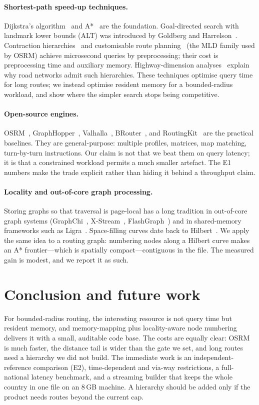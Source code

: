 \documentclass[sigconf,nonacm]{acmart}
\begin{document}
\paragraph{Shortest-path speed-up techniques.}
Dijkstra's algorithm~\cite{dijkstra1959} and A*~\cite{hart1968} are the
foundation. Goal-directed search with landmark lower bounds (ALT) was introduced
by Goldberg and Harrelson~\cite{goldberg2005}. Contraction
hierarchies~\cite{geisberger2008,geisberger2012} and customisable route
planning~\cite{delling2011,delling2017} (the MLD family used by OSRM) achieve
microsecond queries by preprocessing; their cost is preprocessing time and
auxiliary memory. Highway-dimension analyses~\cite{abraham2010,abraham2016}
explain why road networks admit such hierarchies. These techniques optimise query
time for long routes; we instead optimise resident memory for a bounded-radius
workload, and show where the simpler search stops being competitive.

\paragraph{Open-source engines.}
OSRM~\cite{osrm}, GraphHopper~\cite{graphhopper}, Valhalla~\cite{valhalla},
BRouter~\cite{brouter}, and RoutingKit~\cite{dibbelt2014} are the practical
baselines. They are general-purpose: multiple profiles, matrices, map matching,
turn-by-turn instructions. Our claim is not that we beat them on query latency;
it is that a constrained workload permits a much smaller artefact. The E1 numbers
make the trade explicit rather than hiding it behind a throughput claim.

\paragraph{Locality and out-of-core graph processing.}
Storing graphs so that traversal is page-local has a long tradition in
out-of-core graph systems (GraphChi~\cite{kyrola2012}, X-Stream~\cite{royle2013},
FlashGraph~\cite{zheng2015}) and in shared-memory frameworks such as
Ligra~\cite{shun2013}. Space-filling curves date back to
Hilbert~\cite{hilbert1891}. We apply the same idea to a routing graph: numbering
nodes along a Hilbert curve makes an A* frontier---which is spatially
compact---contiguous in the file. The measured gain is modest, and we report it
as such.

\section{Conclusion and future work}
For bounded-radius routing, the interesting resource is not query time but
resident memory, and memory-mapping plus locality-aware node numbering delivers
it with a small, auditable code base. The costs are equally clear: OSRM is much
faster, the distance tail is wider than the gate we set, and long routes need a
hierarchy we did not build. The immediate work is an independent-reference
comparison (E2), time-dependent and via-way restrictions, a full-national latency
benchmark, and a streaming builder that keeps the whole country in one file on an
8\,GB machine. A hierarchy should be added only if the product needs routes beyond
the current cap.



\end{document}
